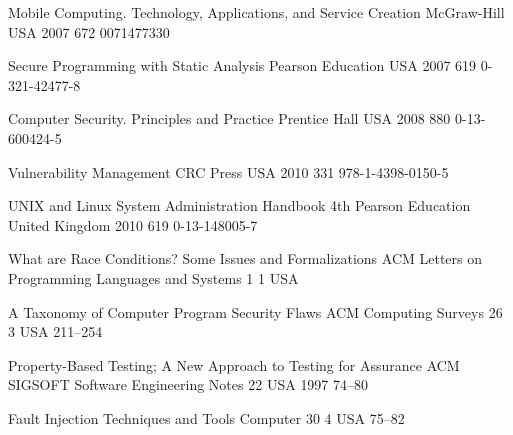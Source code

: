 \begin{thebibliography}{9}
		{
			\BibAnd
			}
		{Mobile Computing. Technology, Applications, and Service Creation}
		{}
		{McGraw-Hill}
		{USA}
		{2007}
		{672}
		{0071477330}
	
		{}
		{Secure Programming with Static Analysis}
		{}
		{Pearson Education}
		{USA}
		{2007}
		{619}
		{0-321-42477-8}
	
		{
			\BibAnd
			}
		{Computer Security. Principles and Practice}
		{}
		{Prentice Hall}
		{USA}
		{2008}
		{880}
		{0-13-600424-5}
	
		{}
		{Vulnerability Management}
		{}
		{CRC Press}
		{USA}
		{2010}
		{331}
		{978-1-4398-0150-5}
	
		{
			\BibAnd
			\BibAnd
			\BibAnd
			}
		{{UNIX} and {L}inux System Administration Handbook}
		{4th}
		{Pearson Education}
		{United Kingdom}
		{2010}
		{619}
		{0-13-148005-7}
		

		{
			\BibAnd
			}
		{What are Race Conditions? Some Issues and Formalizations}
		{ACM Letters on Programming Languages and Systems}
		{1}
		{1}
		{USA}
		{}
		{}
	
		{
			\BibAnd
			\BibAnd
			\BibAnd
			}
		{A Taxonomy of Computer Program Security Flaws}
		{ACM Computing Surveys}
		{26}
		{3}
		{USA}
		{}
		{211--254}
		
		{
			\BibAnd
			}
		{Property-Based Testing; A New Approach to Testing for Assurance}
		{ACM SIGSOFT Software Engineering Notes}
		{22}
		{}
		{USA}
		{1997}
		{74--80}
	
		{
			\BibAnd
			\BibAnd
			}
		{Fault Injection Techniques and Tools}
		{Computer}
		{30}
		{4}
		{USA}
		{}
		{75--82}
	

\end{thebibliography}
